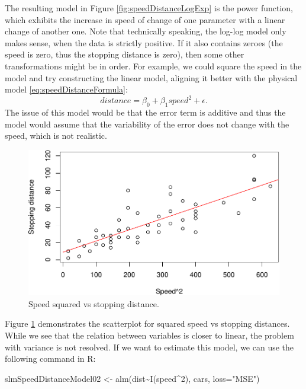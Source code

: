 \documentclass[
]{book}
\newenvironment{Shaded}{\begin{snugshade}}{\end{snugshade}}
\newcommand{\AttributeTok}[1]{\textcolor[rgb]{0.77,0.63,0.00}{#1}}
\newcommand{\DecValTok}[1]{\textcolor[rgb]{0.00,0.00,0.81}{#1}}
\newcommand{\FunctionTok}[1]{\textcolor[rgb]{0.00,0.00,0.00}{#1}}
\newcommand{\NormalTok}[1]{#1}
\newcommand{\OtherTok}[1]{\textcolor[rgb]{0.56,0.35,0.01}{#1}}
\newcommand{\SpecialCharTok}[1]{\textcolor[rgb]{0.00,0.00,0.00}{#1}}
\newcommand{\StringTok}[1]{\textcolor[rgb]{0.31,0.60,0.02}{#1}}
\theoremstyle{definition}
\theoremstyle{definition}
\theoremstyle{definition}
\theoremstyle{definition}
\theoremstyle{remark}
\begin{document}
The resulting model in Figure \ref{fig:speedDistanceLogExp} is the power function, which exhibits the increase in speed of change of one parameter with a linear change of another one. Note that technically speaking, the log-log model only makes sense, when the data is strictly positive. If it also contains zeroes (the speed is zero, thus the stopping distance is zero), then some other transformations might be in order. For example, we could square the speed in the model and try constructing the linear model, aligning it better with the physical model \eqref{eq:speedDistanceFormula}:
\begin{equation}
    distance = \beta_0 + \beta_1 speed^2 + \epsilon .
    \label{eq:speedDistanceModelSquare}
\end{equation}
The issue of this model would be that the error term is additive and thus the model would assume that the variability of the error does not change with the speed, which is not realistic.

\begin{figure}
\centering
\includegraphics{Svetunkov---Statistics-for-Business-Analytics_files/figure-latex/speedDistanceSquare-1.pdf}
\caption{\label{fig:speedDistanceSquare}Speed squared vs stopping distance.}
\end{figure}

Figure \ref{fig:speedDistanceSquare} demonstrates the scatterplot for squared speed vs stopping distances. While we see that the relation between variables is closer to linear, the problem with variance is not resolved. If we want to estimate this model, we can use the following command in R:

\begin{Shaded}
\begin{Highlighting}[]
\NormalTok{slmSpeedDistanceModel02 }\OtherTok{\textless{}{-}} \FunctionTok{alm}\NormalTok{(dist}\SpecialCharTok{\textasciitilde{}}\FunctionTok{I}\NormalTok{(speed}\SpecialCharTok{\^{}}\DecValTok{2}\NormalTok{), cars, }\AttributeTok{loss=}\StringTok{"MSE"}\NormalTok{)}
\end{Highlighting}
\end{Shaded}
\end{document}
